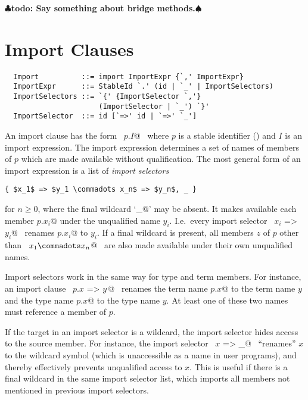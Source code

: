\documentclass[a4paper,12pt,twoside,titlepage]{book}
\renewcommand{\todo}[1]{{$\clubsuit$\bf todo: #1$\spadesuit$}}
\begin{document}
\todo{Say something about bridge methods.}

\section{Import Clauses}
\label{sec:import}

\syntax\begin{lstlisting}
  Import          ::= import ImportExpr {`,' ImportExpr}
  ImportExpr      ::= StableId `.' (id | `_' | ImportSelectors)
  ImportSelectors ::= `{' {ImportSelector `,'} 
                      (ImportSelector | `_') `}'
  ImportSelector  ::= id [`=>' id | `=>' `_']
\end{lstlisting}

An import clause has the form ~\lstinline@import $p$.$I$@~ where $p$ is a stable
identifier () and $I$ is an import expression.
The import expression determines a set of names of members of $p$
which are made available without qualification. The most general form
of an import expression is a list of {\em import selectors}
\begin{lstlisting}
{ $x_1$ => $y_1 \commadots x_n$ => $y_n$, _ }
\end{lstlisting}
for $n \geq 0$, where the final wildcard `\lstinline@_@' may be absent.  It
makes available each member \lstinline@$p$.$x_i$@ under the unqualified name
$y_i$. I.e.\ every import selector ~\lstinline@$x_i$ => $y_i$@~ renames
\lstinline@$p$.$x_i$@ to
$y_i$.  If a final wildcard is present, all members $z$ of
$p$ other than ~\lstinline@$x_1 \commadots x_n$@~ are also made available
under their own unqualified names.

Import selectors work in the same way for type and term members. For
instance, an import clause ~\lstinline@import $p$.{$x$ => $y\,$}@~ renames the term
name \lstinline@$p$.$x$@ to the term name $y$ and the type name \lstinline@$p$.$x$@
to the type name $y$. At least one of these two names must
reference a member of $p$.

If the target in an import selector is a wildcard, the import selector
hides access to the source member. For instance, the import selector
~\lstinline@$x$ => _@~ ``renames'' $x$ to the wildcard symbol (which is
unaccessible as a name in user programs), and thereby effectively
prevents unqualified access to $x$. This is useful if there is a
final wildcard in the same import selector list, which imports all
members not mentioned in previous import selectors.
\end{document}
